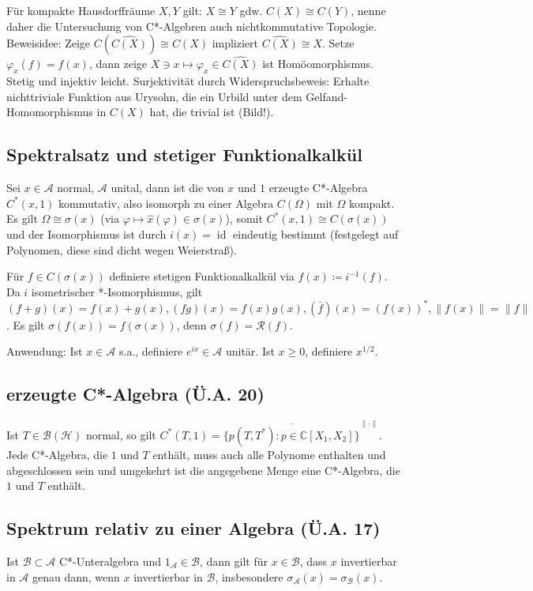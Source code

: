\documentclass[11pt,a4paper]{scrartcl}
\newcommand{\C}{\mathbb{C}} %
\newcommand{\Hc}{\mathcal{H}}
\newcommand{\A}{\mathcal{A}}
\newcommand{\B}{\mathcal{B}}
\newcommand{\Rc}{\mathcal{R}}
\theoremstyle{plain}
\theoremstyle{definition}
\theoremstyle{remark}
\DeclareMathOperator{\id}{id}
\begin{document}
Für kompakte Hausdorffräume $X,Y$ gilt: $X\cong Y$ gdw. $C(X)\cong C(Y)$, nenne daher die Untersuchung von C*-Algebren auch nichtkommutative Topologie. Beweisidee: Zeige $C\left(\widehat{C(X)}\right)\cong C(X)$ impliziert $\widehat{C(X)} \cong X$. Setze $\varphi_x(f)=f(x)$, dann zeige $X\ni x\mapsto \varphi_x \in \widehat{C(X)}$ ist Homöomorphismus. Stetig und injektiv leicht. Surjektivität durch Widerspruchsbeweis: Erhalte nichttriviale Funktion aus Urysohn, die ein Urbild unter dem Gelfand-Homomorphismus in $C(X)$ hat, die trivial ist (Bild!).

\subsection{Spektralsatz und stetiger Funktionalkalkül}

Sei $x\in \A$ normal, $\A$ unital, dann ist die von $x$ und $1$ erzeugte C*-Algebra $C^*(x,1)$ kommutativ, also isomorph zu einer Algebra $C(\Omega)$ mit $\Omega$ kompakt. Es gilt $\Omega \cong \sigma(x)$ (via $\varphi \mapsto \hat x(\varphi) \in \sigma(x)$), somit $C^*(x,1)\cong C(\sigma(x))$ und der Isomorphismus ist durch $i(x)=\id$ eindeutig bestimmt (festgelegt auf Polynomen, diese sind dicht wegen Weierstraß).

Für $f\in C(\sigma(x))$ definiere stetigen Funktionalkalkül via $f(x) \coloneqq i^{-1}(f)$. Da $i$ isometrischer *-Isomorphismus, gilt $(f+g)(x)=f(x)+g(x), (fg)(x)=f(x)g(x), (\bar f)(x)=(f(x))^*, \|f(x)\|=\|f\|$. Es gilt $\sigma(f(x))=f(\sigma(x))$, denn $\sigma(f)=\Rc(f)$.

Anwendung: Ist $x\in \A$ s.a., definiere $e^{ix}\in \A$ unitär. Ist $x \geq 0$, definiere $x^{1/2}$.

\subsection{erzeugte C*-Algebra (Ü.A. 20)}

Ist $T\in \B(\Hc)$ normal, so gilt $C^*(T,1)=\overline{\{p(T,T^*): p\in \C[X_1,X_2]\}}^{\|\cdot\|}$. Jede C*-Algebra, die $1$ und $T$ enthält, muss auch alle Polynome enthalten und abgeschlossen sein und umgekehrt ist die angegebene Menge eine C*-Algebra, die $1$ und $T$ enthält.

\subsection{Spektrum relativ zu einer Algebra (Ü.A. 17)}

Ist $\B \subset \A$ C*-Unteralgebra und $1_\mathcal{A} \in \B$, dann gilt für $x\in \B$, dass $x$ invertierbar in $\A$ genau dann, wenn $x$ invertierbar in $\B$, insbesondere $\sigma_\A(x)=\sigma_\B(x)$.
\end{document}
